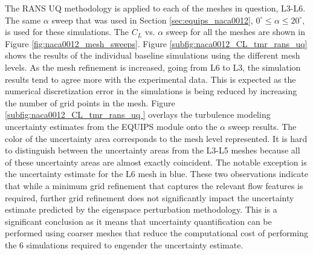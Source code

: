 The RANS UQ methodology is applied to each of the meshes in question, L3-L6.
The same $\alpha$ sweep that was used in Section \ref{sec:equips_naca0012}, $0^\circ \leq \alpha \leq 20^\circ$, is used for these simulations. 
The $C_L$ vs. $\alpha$ sweep for all the meshes are shown in Figure \ref{fig:naca0012_mesh_sweeps}. 
Figure \ref{subfig:naca0012_CL_tmr_rans_uq} shows the results of the individual baseline simulations using the different mesh levels. 
As the mesh refinement is increased, going from L6 to L3, the simulation results tend to agree more with the experimental data. 
This is expected as the numerical discretization error in the simulations is being reduced by increasing the number of grid points in the mesh. 
Figure \ref{subfig:naca0012_CL_tmr_rans_uq } overlays the turbulence modeling uncertainty estimates from the EQUIPS module onto the $\alpha$ sweep results.
The color of the uncertainty area corresponds to the mesh level represented.
It is hard to distinguish between the uncertainty areas from the L3-L5 meshes because all of these uncertainty areas are almost exactly coincident.
The notable exception is the uncertainty estimate for the L6 mesh in blue. 
These two observations indicate that while a minimum grid refinement that captures the relevant flow features is required, further grid refinement does not significantly impact the uncertainty estimate predicted by the eigenspace perturbation methodology.
This is a significant conclusion as it means that uncertainty quantification can be performed using coarser meshes that reduce the computational cost of performing the 6 simulations required to engender the uncertainty estimate. 

